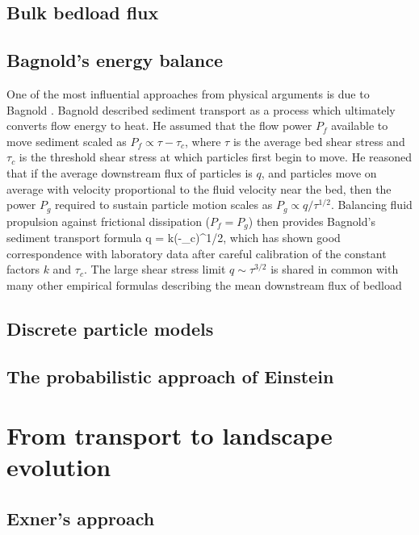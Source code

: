 \subsection{Bulk bedload flux}


\subsection{Bagnold's energy balance}

One of the most influential approaches from physical arguments is due to Bagnold \citep{Bagnold1956,Bagnold1966}.
Bagnold described sediment transport as a process which ultimately converts flow energy to heat.
He assumed that the flow power $P_f$ available to move sediment scaled as $P_f \propto \tau - \tau_c$, where $\tau$ is the average bed shear stress and $\tau_c$ is the threshold shear stress at which particles first begin to move. 
He reasoned that if the average downstream flux of particles is $q$, and particles move on average with velocity proportional to the fluid velocity near the bed, then the power $P_g$ required to sustain particle motion scales as $P_g \propto q/\tau^{1/2}. $ Balancing fluid propulsion against frictional dissipation ($P_f = P_g$) then provides Bagnold's sediment transport formula
\be q = k(\tau-\tau_c)\tau^{1/2}, \label{eq:bagnold}\ee
which has shown good correspondence with laboratory data after careful calibration of the constant factors $k$ and $\tau_c$.
The large shear stress limit $q \sim \tau^{3/2}$ is shared in common with many other empirical formulas describing the mean downstream flux of bedload \citep[e.g.][]{MeyerPeter1948, Yalin1972}

\subsection{Discrete particle models}


\subsection{The probabilistic approach of Einstein}


\section{From transport to landscape evolution}


\subsection{Exner's approach} 

